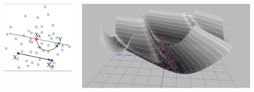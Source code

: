 \documentclass[aspectratio=169]{beamer}
\begin{document}
\begin{frame}
\begin{columns}
\begin{columns}
        \includegraphics[width=\textwidth]{figures/zeus}
        \end{columns}
        \includegraphics[width=\textwidth]{figures/hmc_explained}
    \end{columns}
\end{frame}
\end{document}
